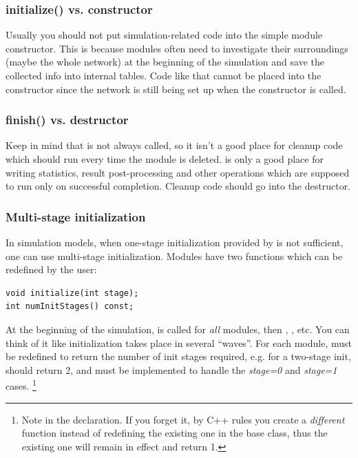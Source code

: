 \subsubsection{initialize() vs. constructor}


Usually you should not put simulation-related code into the
simple module constructor. This is because
modules often need to investigate their surroundings (maybe
the whole network) at the beginning of the simulation and save the
collected info into internal tables.  Code like that cannot be placed
into the constructor since the network is still being set up when the
constructor is called.


\subsubsection{finish() vs. destructor}


Keep in mind that  is not always called, so it isn't a
good place for cleanup code which should run every time the module is
deleted.  is only a good place for writing statistics,
result post-processing and other operations  which are supposed to run only on
successful completion. Cleanup code should go into the
destructor.


\subsubsection{Multi-stage initialization}


In simulation models, when one-stage
initialization provided by 
is not sufficient, one can use multi-stage
initialization.  Modules have two
functions which can be redefined by the user:

\begin{verbatim}
void initialize(int stage);
int numInitStages() const;
\end{verbatim}

At the beginning of the simulation, 
is called for \textit{all} modules, then ,
, etc. You can think of it like
initialization takes place in several ``waves''. For each module,
 must be redefined to return the number of init
stages required, e.g. for a two-stage init, 
should return 2, and  must be implemented to
handle the \textit{stage=0} and \textit{stage=1} cases.
  \footnote{Note  in the  declaration.
  If you forget it, by C++ rules you create a \textit{different} function
  instead of redefining the existing one in the base class, thus the
  existing one will remain in effect and return 1.}

